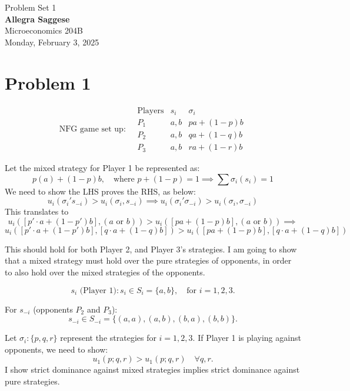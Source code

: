 \documentclass{article}
\begin{document}
\begin{titlepage}
    \centering
    \vspace*{1in} %
    {\Large Problem Set 1} \\[1.5cm] %


    {\Large \textbf{Allegra Saggese}} \\[0.5cm] %
    {\large Microeconomics 204B} \\[1.5cm]

    {\large Monday, February 3, 2025} %
    \\[2cm] %

\end{titlepage}

\section{Problem 1}

\[
\text{NFG game set up:} \quad 
\begin{array}{c|c|c}
\text{Players} & s_i & \sigma_i \\
\hline
P_1 & a, b & pa + (1-p)b \\
P_2 & a,b  & qa +(1-q)b \\
P_3 & a, b & ra + (1-r)b
\end{array}
\]

Let the mixed strategy for Player 1 be represented as:
\[
p(a) + (1-p)b, \quad \text{where } p + (1-p) = 1 \implies \sum\sigma_i(s_i) = 1
\]
We need to show the LHS proves the RHS, as below: 
\[
u_i(\sigma_i' s_{-i}) > u_i(\sigma_i, s_{-i}) \implies u_i(\sigma_i' \sigma_{-i}) > u_i(\sigma_i, \sigma_{-i}) 
\]
This translates to 
\[
u_i([p' \cdot a + (1-p')b], (a \text{ or } b)) > u_i([pa + (1-p)b], (a \text{ or } b)) \implies \]
\[
u_i([p' \cdot a + (1-p')b], [q \cdot a + (1-q)b]) > u_i([pa + (1-p)b], [q \cdot a + (1-q)b]) 
\]

\noindent This should hold for both Player 2, and Player 3's strategies. I am going to show that a mixed strategy must hold over the pure strategies of opponents, in order to also hold over the mixed strategies of the opponents. 

\[
s_i \text{ (Player 1)} : s_i \in S_i = \{a, b\}, \quad \text{for } i = 1, 2, 3.
\]

For $s_{-i}$ (opponents $P_2$ and $P_3$):
\[
s_{-i} \in S_{-i} = \{(a, a), (a, b), (b, a), (b, b)\}.
\]

Let $\sigma_i : \{p, q, r\}$ represent the strategies for $i = 1, 2, 3$. If Player 1 is playing against opponents, we need to show:
\[
u_1(p; q, r) > u_1(p; q, r) \quad \forall q, r.
\]
I show strict dominance against mixed strategies implies strict dominance against pure strategies.
\end{document}
